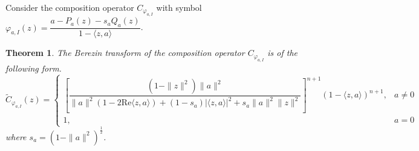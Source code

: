 \documentclass{amsart}
\newtheorem{theorem}{Theorem}
\theoremstyle{remark}
\begin{document}
Consider the composition operator $C_{\varphi_{a,I}}$ with symbol $\varphi_{a,I}(z)= \dfrac{a - P_{a}(z) - s_{a}Q_{a}(z)}{1 - \langle z,a \rangle }$.
\begin{theorem}\label{Th: Blaschke type symbol}
    The Berezin transform of the composition operator $C_{\varphi_{a,I}}$ is of the following form.
    \begin{equation*}
        \widetilde{C}_{\varphi_{a,I}}(z) =
        \begin{cases}
            \left[ \dfrac{(1 - \|z\|^{2})\|a\|^{2}}{\|a\|^{2}(1-2\mathrm{Re}\langle z,a \rangle) + (1-s_{a})|\langle z,a \rangle|^2 + s_{a}\|a\|^2\|z\|^2}\right]^{n+1}(1 - \langle z,a \rangle)^{n+1}, & a \neq 0 \\
            1, & a = 0
        \end{cases}
    \end{equation*}
    where $s_{a} = (1 - \|a\|^{2})^{\frac{1}{2}}$.
\end{theorem}
\end{document}
